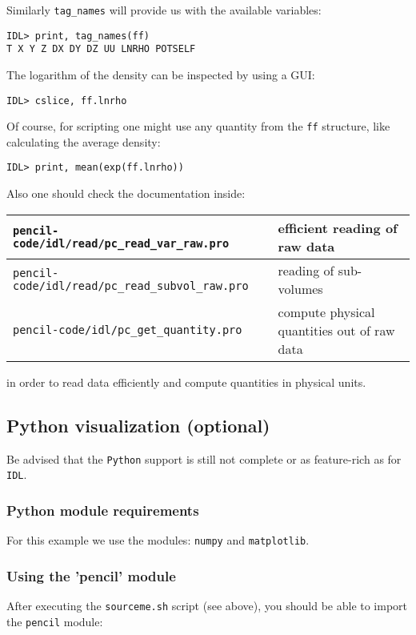 \documentclass[a4paper,12pt]{article}
\begin{document}
Similarly \verb|tag_names| will provide us with the available variables:
\begin{verbatim}
IDL> print, tag_names(ff)
T X Y Z DX DY DZ UU LNRHO POTSELF
\end{verbatim}

The logarithm of the density can be inspected by using a GUI:
\begin{verbatim}
IDL> cslice, ff.lnrho
\end{verbatim}

Of course, for scripting one might use any quantity from the \verb|ff| structure, like calculating the average density:
\begin{verbatim}
IDL> print, mean(exp(ff.lnrho))
\end{verbatim}

Also one should check the documentation inside:
\begin{center}
\begin{tabular}{|l|l|}\hline
  \verb|pencil-code/idl/read/pc_read_var_raw.pro| & efficient reading of raw data\\\hline
  \verb|pencil-code/idl/read/pc_read_subvol_raw.pro| & reading of sub-volumes\\\hline
  \verb|pencil-code/idl/pc_get_quantity.pro| & compute physical quantities out of raw data\\\hline
\end{tabular}
\end{center}
in order to read data efficiently and compute quantities in physical units.


\subsection{Python visualization (optional)}
Be advised that the \verb|Python| support is still not complete or as feature-rich as for \verb|IDL|.

\subsubsection{Python module requirements}
For this example we use the modules: \verb|numpy| and \verb|matplotlib|.

\subsubsection{Using the 'pencil' module}
After executing the \verb|sourceme.sh| script (see above), you should be able to import the \verb|pencil| module:
\end{document}
